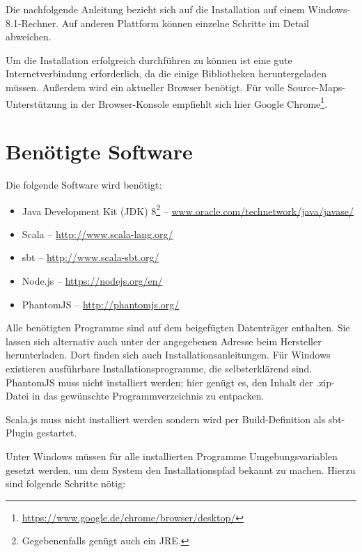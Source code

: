 \documentclass[a4paper, 12pt, hidelinks, listof=totoc, listoftables=totoc, bibliography=totoc]{scrreprt}
\newcommand{\TODOi}[1]{\textcolor{red}{\{#1\}}}
\begin{document}
Die nachfolgende Anleitung bezieht sich auf die Installation auf einem Windows-8.1-Rechner. Auf anderen Plattform können einzelne Schritte im Detail abweichen.

Um die Installation erfolgreich durchführen zu können ist eine gute Internetverbindung erforderlich, da die einige Bibliotheken heruntergeladen müssen. Außerdem wird ein aktueller Browser benötigt. Für volle Source-Maps-Unterstützung in der Browser-Konsole empfiehlt sich hier Google Chrome\footnote{\url{https://www.google.de/chrome/browser/desktop/}}.

\section{Benötigte Software}

Die folgende Software wird benötigt:

\begin{itemize}
	\item Java Development Kit (JDK) 8\footnote{Gegebenenfalls genügt auch ein JRE.}  --  \url{www.oracle.com/technetwork/java/javase/}
	\item Scala  --  \url{http://www.scala-lang.org/}
	\item sbt  --  \url{http://www.scala-sbt.org/}
	\item Node.js  --  \url{https://nodejs.org/en/}
	\item PhantomJS  --  \url{http://phantomjs.org/}
\end{itemize}

Alle benötigten Programme sind auf dem beigefügten Datenträger enthalten. Sie lassen sich alternativ auch unter der angegebenen Adresse beim Hersteller herunterladen. Dort finden sich auch Installationsanleitungen. Für Windows existieren ausführbare Installationsprogramme, die selbsterklärend sind. PhantomJS muss nicht installiert werden; hier genügt es, den Inhalt der .zip-Datei in das gewünschte Programmverzeichnis zu entpacken.

Scala.js muss nicht installiert werden sondern wird per Build-Definition als sbt-Plugin gestartet.

Unter Windows müssen für alle installierten Programme Umgebungsvariablen gesetzt werden, um dem System den Installationspfad bekannt zu machen. Hierzu sind folgende Schritte nötig:
\end{document}
